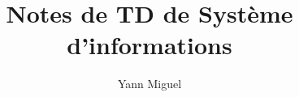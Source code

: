 \documentclass[a4paper, 12pt]{article}
\title{Notes de TD de Syst\`eme d'informations}
\author{Yann Miguel}
\begin{document}
\ttfamily
\maketitle
\tableofcontents
\newpage


\end{document}
